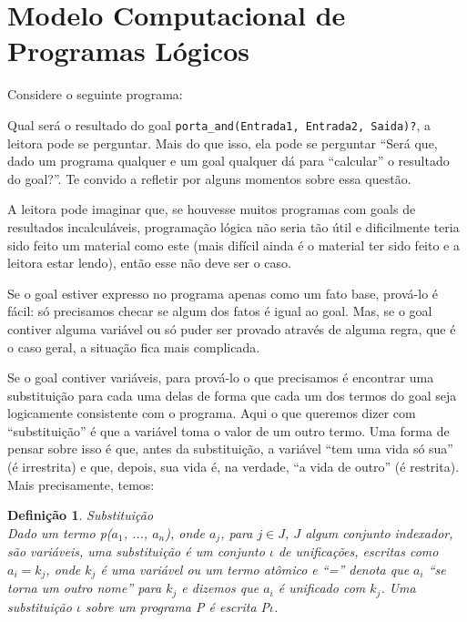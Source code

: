 \documentclass{article}
\newtheorem{definition}{Definição}[section]
\theoremstyle{remark}
\theoremstyle{theorem}
\begin{document}
\section{Modelo Computacional de Programas Lógicos}

Considere o seguinte programa:




Qual será o resultado do goal {\tt porta\_and(Entrada1, Entrada2, Saida)?}, a leitora pode se perguntar. Mais do que isso, ela pode se perguntar ``Será que, dado um programa qualquer e um goal qualquer dá para ``calcular'' o resultado do goal?''. Te convido a refletir por alguns momentos sobre essa questão.


A leitora pode imaginar que, se houvesse muitos programas com goals de resultados incalculáveis, programação lógica não seria tão útil e dificilmente teria sido feito um material como este (mais difícil ainda é o material ter sido feito e a leitora estar lendo), então esse não deve ser o caso.

Se o goal estiver expresso no programa apenas como um fato base, prová-lo é fácil: só precisamos checar se algum dos fatos é igual ao goal. Mas, se o goal contiver alguma variável ou só puder ser provado através de alguma regra, que é o caso geral, a situação fica mais complicada.

Se o goal contiver variáveis, para prová-lo o que precisamos é encontrar uma substituição para cada uma delas de forma que cada um dos termos do goal seja logicamente consistente com o programa. Aqui o que queremos dizer com ``substituição'' é que a variável toma o valor de um outro termo. Uma forma de pensar sobre isso é que, antes da substituição, a variável ``tem uma vida só sua'' (é irrestrita) e que, depois, sua vida é, na verdade, ``a vida de
outro'' (é restrita). Mais precisamente, temos:\\

\begin{definition}{Substituição}\\
  Dado um termo {\it p($a_1$, ..., $a_n$)}, onde $a_j$, para $j \in J$, $J$ algum conjunto indexador, são variáveis, uma substituição é um conjunto $\iota$ de \textit{unificações}, escritas como $a_i = k_j$, onde $k_j$ é uma variável ou um termo atômico e ``='' denota que $a_i$ ``se torna um outro nome'' para $k_j$ e dizemos que $a_i$ é unificado com $k_j$.
  Uma substituição $\iota$ sobre um programa P é escrita P$\iota$.
\end{definition}
\end{document}

